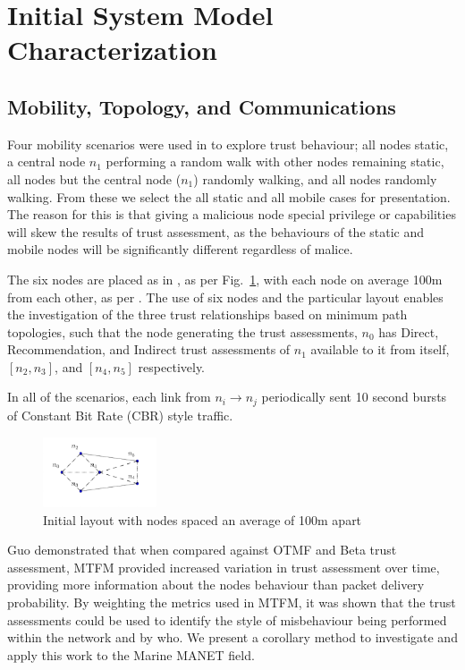 \documentclass[runningheads,a4paper]{llncs}
\begin{document}
\section{Initial System Model Characterization}\label{sec:initialsystemcharacterization}

\subsection{Mobility, Topology, and Communications}

Four mobility scenarios were used in \cite{Guo11} to explore trust behaviour; all nodes static, a central node $n_1$ performing a random walk with other nodes remaining static, all nodes but the central node ($n_1$) randomly walking, and all nodes randomly walking. From these we select the all static and all mobile cases for presentation.
The reason for this is that giving a malicious node special privilege or capabilities will skew the results of trust assessment, as the behaviours of the static and mobile nodes will be significantly different regardless of malice.

The six nodes are placed as in \cite{Guo11}, as per Fig.~\ref{fig:s1_layout}, with each node on average 100m from each other, as per \cite{Guo11}.
The use of six nodes and the particular layout enables the investigation of the three trust relationships based on minimum path topologies, such that the node generating the trust assessments, $n_0$ has Direct, Recommendation, and Indirect trust assessments of $n_1$ available to it from itself, $[n_2,n_3]$, and $[n_4,n_5]$ respectively.

In all of the scenarios, each link from $n_i \rightarrow n_j$ periodically sent 10 second bursts of Constant Bit Rate (CBR) style traffic.
%
\begin{figure}[h]
  \centering
  \includegraphics[width=0.3\textwidth]{img/s1_layout.pdf}
  \caption{Initial layout with nodes spaced an average of 100m apart}
  \label{fig:s1_layout}
\end{figure}
%
Guo demonstrated that when compared against OTMF and Beta trust assessment, MTFM provided increased variation in trust assessment over time, providing more information about the nodes behaviour than packet delivery probability. 
By weighting the metrics used in MTFM, it was shown that the trust assessments could be used to identify the style of misbehaviour being performed within the network and by who.
We present a corollary method to investigate and apply this work to the Marine MANET field.
\end{document}
